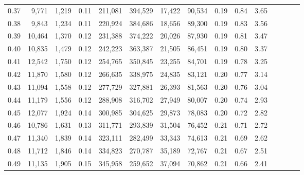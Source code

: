 \begin{tabular}{rrrcrrrrrrrrrrr}
0.37 &   9,771 &  1,219 &                                       0.11 &  211,081 &  394,529 &   17,422 &   90,534 &  0.19 &  0.84 &                         3.65 \\
0.38 &   9,843 &  1,234 &                                       0.11 &  220,924 &  384,686 &   18,656 &   89,300 &  0.19 &  0.83 &                         3.56 \\
0.39 &  10,464 &  1,370 &                                       0.12 &  231,388 &  374,222 &   20,026 &   87,930 &  0.19 &  0.81 &                         3.47 \\
0.40 &  10,835 &  1,479 &                                       0.12 &  242,223 &  363,387 &   21,505 &   86,451 &  0.19 &  0.80 &                         3.37 \\
0.41 &  12,542 &  1,750 &                                       0.12 &  254,765 &  350,845 &   23,255 &   84,701 &  0.19 &  0.78 &                         3.25 \\
0.42 &  11,870 &  1,580 &                                       0.12 &  266,635 &  338,975 &   24,835 &   83,121 &  0.20 &  0.77 &                         3.14 \\
0.43 &  11,094 &  1,558 &                                       0.12 &  277,729 &  327,881 &   26,393 &   81,563 &  0.20 &  0.76 &                         3.04 \\
0.44 &  11,179 &  1,556 &                                       0.12 &  288,908 &  316,702 &   27,949 &   80,007 &  0.20 &  0.74 &                         2.93 \\
0.45 &  12,077 &  1,924 &                                       0.14 &  300,985 &  304,625 &   29,873 &   78,083 &  0.20 &  0.72 &                         2.82 \\
0.46 &  10,786 &  1,631 &                                       0.13 &  311,771 &  293,839 &   31,504 &   76,452 &  0.21 &  0.71 &                         2.72 \\
0.47 &  11,340 &  1,839 &                                       0.14 &  323,111 &  282,499 &   33,343 &   74,613 &  0.21 &  0.69 &                         2.62 \\
0.48 &  11,712 &  1,846 &                                       0.14 &  334,823 &  270,787 &   35,189 &   72,767 &  0.21 &  0.67 &                         2.51 \\
0.49 &  11,135 &  1,905 &                                       0.15 &  345,958 &  259,652 &   37,094 &   70,862 &  0.21 &  0.66 &                         2.41 \\

\end{tabular}
